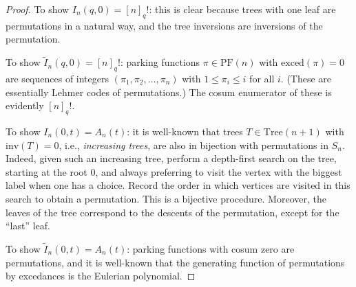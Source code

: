 \documentclass[10pt,a4paper]{amsart}
\begin{document}
\begin{proof}
To show $I_n(q,0)=[n]_q!$: this is clear because trees with one leaf are permutations in a natural way, and the tree inversions are inversions of the permutation.

To show $\widetilde{I}_n(q,0) = [n]_q!$: parking functions $\pi\in \mathrm{PF}(n)$ with $\mathrm{exced}(\pi)=0$ are sequences of integers $(\pi_1,\pi_2,\ldots,\pi_n)$ with $1 \leq \pi_i \leq i$ for all $i$. (These are essentially Lehmer codes of permutations.) The cosum enumerator of these is evidently $[n]_q!$.

To show $I_n(0,t)=A_n(t)$: it is well-known that trees $T \in \mathrm{Tree}(n+1)$ with $\mathrm{inv}(T)=0$, i.e., \emph{increasing trees}, are also in bijection with permutations in $S_n$. Indeed, given such an increasing tree, perform a depth-first search on the tree, starting at the root $0$, and always preferring to visit the vertex with the biggest label when one has a choice. Record the order in which vertices are visited in this search to obtain a permutation. This is a bijective procedure. Moreover, the leaves of the tree correspond to the descents of the permutation, except for the ``last'' leaf.

To show $\widetilde{I}_n(0,t)=A_n(t)$: parking functions with cosum zero are permutations, and it is well-known that the generating function of permutations by excedances is the Eulerian polynomial.
\end{proof}
\end{document}
